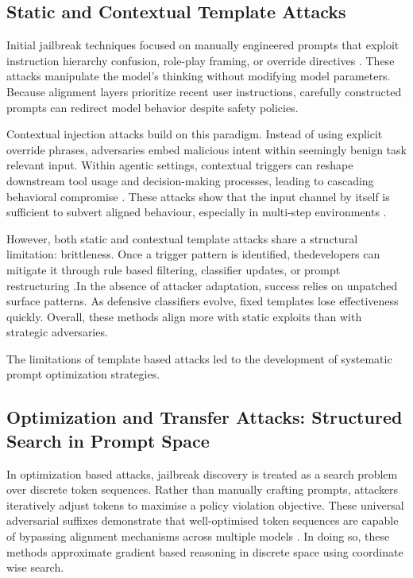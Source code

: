 \documentclass[conference]{IEEEtran}
\begin{document}
\subsection{Static and Contextual Template Attacks}

Initial jailbreak techniques focused on manually engineered prompts that exploit instruction hierarchy confusion, role-play framing, or override directives \cite{b2,b3}. These attacks manipulate the model's thinking without modifying model parameters. Because alignment layers prioritize recent user instructions, carefully constructed prompts can redirect model behavior despite safety policies.

Contextual injection attacks build on this paradigm. Instead of using explicit override phrases, adversaries embed malicious intent within seemingly benign task relevant input. Within agentic settings, contextual triggers can reshape downstream tool usage and decision-making processes, leading to cascading behavioral compromise \cite{b12}. These attacks show that the input channel by itself is sufficient to subvert aligned behaviour, especially in multi-step environments \cite{b1,b4}.

However, both static and contextual template attacks share a structural limitation: brittleness. Once a trigger pattern is identified, thedevelopers can mitigate it through rule based filtering, classifier updates, or prompt restructuring \cite{b2,b17}.In the absence of attacker adaptation, success relies on unpatched surface patterns. As defensive classifiers evolve, fixed templates lose effectiveness quickly. Overall, these methods align more with static exploits than with strategic adversaries.

The limitations of template based attacks led to the development of systematic prompt optimization strategies.

\subsection{Optimization and Transfer Attacks: Structured Search in Prompt Space}

In optimization based attacks, jailbreak discovery is treated as a search problem over discrete token sequences. Rather than manually crafting prompts, attackers iteratively adjust tokens to maximise a policy violation objective. These universal adversarial suffixes demonstrate that well-optimised token sequences are capable of bypassing alignment mechanisms across multiple models \cite{b10}. In doing so, these methods approximate gradient based reasoning in discrete space using coordinate wise search.
\end{document}
